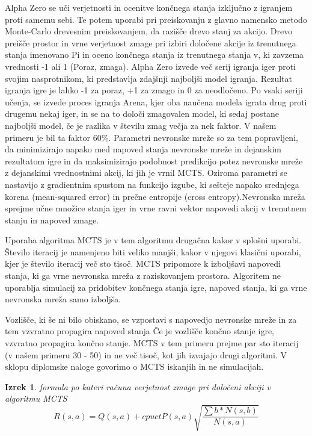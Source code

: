 \documentclass[a4paper, 12pt]{book}
\newtheorem{izrek}{Izrek}[chapter]
\begin{document}
Alpha Zero se uči verjetnosti in ocenitve končnega stanja izključno z igranjem proti samemu sebi. 
Te potem uporabi pri preiskovanju z glavno namensko metodo Monte-Carlo drevesnim preiskovanjem, da razišče drevo stanj za akcijo.
Drevo preišče prostor in vrne verjetnost zmage pri izbiri določene akcije iz trenutnega stanja imenovano Pi in oceno končnega stanja iz trenutnega stanja v, ki zavzema vrednosti -1 ali 1 (Poraz, zmaga).
Alpha Zero izvede več serij igranja iger proti svojim nasprotnikom, ki predstavlja zdajšnji najboljši model igranja.
Rezultat igranja igre je lahko -1 za poraz, +1 za zmago in 0 za neodločeno.
Po vsaki seriji učenja, se izvede proces igranja Arena, kjer oba naučena modela igrata drug proti drugemu nekaj iger, in se na to določi zmagovalen model, ki sedaj postane najboljši model, če je razlika v številu zmag večja za nek faktor. V našem primeru je bil ta faktor 60\%.
Parametri nevronske mreže so za tem popravljeni, da minimizirajo napako med napoved stanja nevronske mreže in dejanskim rezultatom igre in da maksimizirajo podobnost predikcijo potez nevronske mreže z dejanskimi vrednostnimi akcij, ki jih je vrnil MCTS. Oziroma parametri se nastavijo z gradientnim spustom na funkcijo izgube, ki sešteje napako srednjega korena (mean-squared error) in prečne entropije (cross entropy).Nevronska mreža sprejme učne množice stanja iger in vrne ravni vektor napovedi akcij v trenutnem stanju in napoved zmage.

Uporaba algoritma MCTS je v tem algoritmu drugačna kakor v splošni uporabi.
Število iteracij je namenjeno biti veliko manjši, kakor v njegovi klasični uporabi, kjer je število iteracij več sto tisoč. 
MCTS pripomore k izboljšavi napovedi stanja, ki ga vrne nevronska mreža z raziskovanjem prostora.
Algoritem ne uporablja simulacij za pridobitev končnega stanja igre, napoved stanja, ki ga vrne nevronska mreža samo izboljša.

Vozlišče, ki še ni bilo obiskano, se vzpostavi s napovedjo nevronske mreže in za tem vzvratno propagira napoved stanja
Če je vozlišče končno stanje igre, vzvratno propagira končno stanje.
MCTS v tem primeru prejme par sto iteracij (v našem primeru 30 - 50) in ne več tisoč, kot jih izvajajo drugi algoritmi.
V sklopu diplomske naloge govorimo o MCTS iskanjih in ne simulacijah.


\begin{izrek}
	\label{iz:1}
	formula po kateri računa verjetnost zmage pri določeni akciji v algoritmu MCTS
	\begin{equation}
	R(s,a) = Q(s,a) + cpuctP(s, a)\sqrt{\dfrac{\sum{b}*N(s,b)}{N(s,a)}}
	\label{eq:mctsFormula}
	\end{equation}
\end{izrek}
\end{document}
